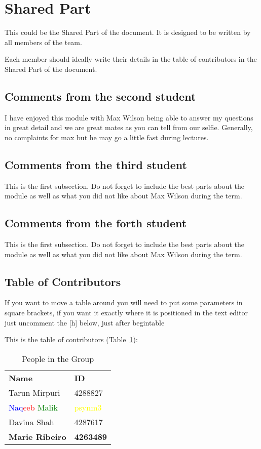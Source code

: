 \section{Shared Part}

This could be the Shared Part of the document. It is designed to be written by all members of the team.

Each member should ideally write their details in the table of contributors in the Shared Part of the document.



\subsection{Comments from the second student}
I have enjoyed this module with Max Wilson being able to answer my questions in great detail and we are great mates as you can tell from our selfie.
Generally, no complaints for max but he may go a little fast during lectures.

\subsection{Comments from the third student}
This is the first subsection. Do not forget to include the best parts about the module as well as what you did not like about Max Wilson during the term.

\subsection{Comments from the forth student}
This is the first subsection. Do not forget to include the best parts about the module as well as what you did not like about Max Wilson during the term.

\subsection{Table of Contributors}


If you want to move a table around you will need to put some parameters in square brackets, if you want it exactly where it is positioned in the text editor just uncomment the [h] below, just after begin{table}

This is the table of contributors (Table~\ref{authors}):
\begin{table}[h]
\centering
\caption{People in the Group}
\label{authors}
\begin{tabular}{|l|l|}
\textbf{Name} & \textbf{ID} \\
Tarun Mirpuri & 4288827    \\
\hline
\textcolor{blue}{Naq}\textcolor{red}{eeb} \textcolor{green}{Malik} & \textcolor{yellow}{psynm3} \\
\hline
Davina Shah & 4287617  \\
\hline
\textbf{Marie Ribeiro} & \textbf{4263489} \\
\end{tabular}
\end{table}